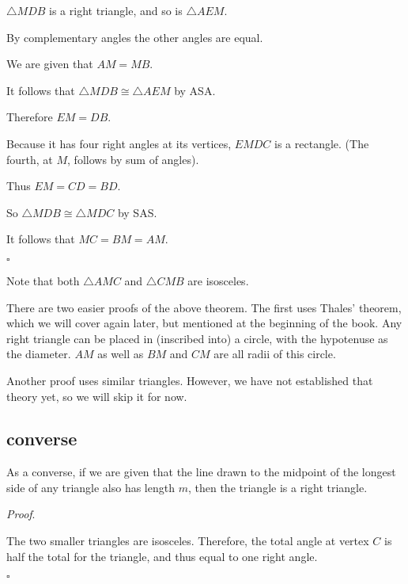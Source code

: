 \documentclass[11pt, oneside]{article}
\begin{document}
$\triangle MDB$ is a right triangle, and so is $\triangle AEM$.

By complementary angles the other angles are equal.

We are given that $AM = MB$.

It follows that $\triangle MDB \cong \triangle AEM$ by ASA.

Therefore $EM = DB$.

Because it has four right angles at its vertices, $EMDC$ is a rectangle.  (The fourth, at $M$, follows by sum of angles).

Thus $EM = CD = BD$.

So $\triangle MDB \cong \triangle MDC$ by SAS.

It follows that $MC = BM = AM$.

$\square$

Note that both $\triangle AMC$ and $\triangle CMB$ are isosceles.

There are two easier proofs of the above theorem.  The first uses Thales' theorem, which we will cover again later, but mentioned at the beginning of the book.  Any right triangle can be placed in (inscribed into) a circle, with the hypotenuse as the diameter.  $AM$ as well as $BM$ and $CM$ are all radii of this circle.

Another proof uses similar triangles.  However, we have not established that theory yet, so we will skip it for now.

\subsection*{converse}

As a converse, if we are given that the line drawn to the midpoint of the longest side of any triangle also has length $m$, then the triangle is a right triangle.

\emph{Proof}.

The two smaller triangles are isosceles.  Therefore, the total angle at vertex $C$ is half the total for the triangle, and thus equal to one right angle.

$\square$
\end{document}
